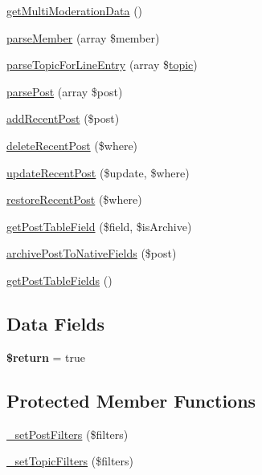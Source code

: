 \begin{DoxyCompactItemize}
\hyperlink{classapp__forums__classes__topics_a4840b0a01c591f0a90373151b77a40fb}{get\-Multi\-Moderation\-Data} ()
\item 
\hyperlink{classapp__forums__classes__topics_a1d122274f10c4381209c82a9b8c1a305}{parse\-Member} (array \$member)
\item 
\hyperlink{classapp__forums__classes__topics_a43c3aeb4184a2ac07a14c6c65c02d1d7}{parse\-Topic\-For\-Line\-Entry} (array \$\hyperlink{classtopic}{topic})
\item 
\hyperlink{classapp__forums__classes__topics_abdfe201884fd7d9755e47cd8ce959f79}{parse\-Post} (array \$post)
\item 
\hyperlink{classapp__forums__classes__topics_a8a5de06c48f6bc71dca5bdc93c961165}{add\-Recent\-Post} (\$post)
\item 
\hyperlink{classapp__forums__classes__topics_a0f0464a3e3b14366432a7baf3d60fd13}{delete\-Recent\-Post} (\$where)
\item 
\hyperlink{classapp__forums__classes__topics_a33c2b20cf8356bc357c6f8008626d647}{update\-Recent\-Post} (\$update, \$where)
\item 
\hyperlink{classapp__forums__classes__topics_afc10aac190bcb1d120ce7d2cbb9bdd2d}{restore\-Recent\-Post} (\$where)
\item 
\hyperlink{classapp__forums__classes__topics_af9cced2da51a34a78b4eafa3a940ea8c}{get\-Post\-Table\-Field} (\$field, \$is\-Archive)
\item 
\hyperlink{classapp__forums__classes__topics_a71c6dba06a8cf4c92d355c6ac1884a9f}{archive\-Post\-To\-Native\-Fields} (\$post)
\item 
\hyperlink{classapp__forums__classes__topics_a2c71ed453ae06c42990c1efbb3e8a226}{get\-Post\-Table\-Fields} ()
\end{DoxyCompactItemize}
\subsection*{Data Fields}
\begin{DoxyCompactItemize}
\item 
\hypertarget{classapp__forums__classes__topics_a9e8633cf48f7c5fc8cc9f5fa31450b99}{{\bfseries \$return} = true}\label{classapp__forums__classes__topics_a9e8633cf48f7c5fc8cc9f5fa31450b99}

\end{DoxyCompactItemize}
\subsection*{Protected Member Functions}
\begin{DoxyCompactItemize}
\item 
\hyperlink{classapp__forums__classes__topics_a9019c5938ee15575deb946e2c4d29202}{\-\_\-set\-Post\-Filters} (\$filters)
\item 
\hyperlink{classapp__forums__classes__topics_aa60a9436d8ab35a14ecd1c1f087c5652}{\-\_\-set\-Topic\-Filters} (\$filters)
\end{DoxyCompactItemize}
